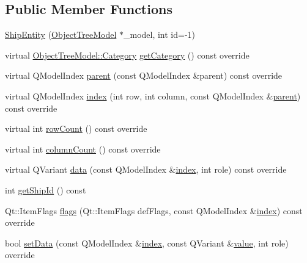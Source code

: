 \subsection*{Public Member Functions}
\begin{DoxyCompactItemize}
\item 
\mbox{\hyperlink{classobjecttree_1_1_ship_entity_afb4b92fd6641d4ee6010d59c5bfec957}{Ship\+Entity}} (\mbox{\hyperlink{class_object_tree_model}{Object\+Tree\+Model}} $\ast$\+\_\+model, int id=-\/1)
\item 
virtual \mbox{\hyperlink{class_object_tree_model_a379e9d6b0d381853785adf62095ba4e3}{Object\+Tree\+Model\+::\+Category}} \mbox{\hyperlink{classobjecttree_1_1_ship_entity_a1d9cd40e6965ab6bf90e4a7953907224}{get\+Category}} () const override
\item 
virtual Q\+Model\+Index \mbox{\hyperlink{classobjecttree_1_1_ship_entity_adafd4b75476c3d15829c75bae3cb2166}{parent}} (const Q\+Model\+Index \&parent) const override
\item 
virtual Q\+Model\+Index \mbox{\hyperlink{classobjecttree_1_1_ship_entity_ad72753eef565dec48ce6a4b8fcd07c4e}{index}} (int row, int column, const Q\+Model\+Index \&\mbox{\hyperlink{classobjecttree_1_1_ship_entity_adafd4b75476c3d15829c75bae3cb2166}{parent}}) const override
\item 
virtual int \mbox{\hyperlink{classobjecttree_1_1_ship_entity_a725ce29cc4d65bdf546d77aef042a046}{row\+Count}} () const override
\item 
virtual int \mbox{\hyperlink{classobjecttree_1_1_ship_entity_a54b5e8e43ee06d70ab23b23c5a648aa8}{column\+Count}} () const override
\item 
virtual Q\+Variant \mbox{\hyperlink{classobjecttree_1_1_ship_entity_ad1fd003ed90d82f0c621292941484e5b}{data}} (const Q\+Model\+Index \&\mbox{\hyperlink{classobjecttree_1_1_ship_entity_ad72753eef565dec48ce6a4b8fcd07c4e}{index}}, int role) const override
\item 
int \mbox{\hyperlink{classobjecttree_1_1_ship_entity_a9493004c5dfe0a9ecd8362e3eefc17e9}{get\+Ship\+Id}} () const
\item 
Qt\+::\+Item\+Flags \mbox{\hyperlink{classobjecttree_1_1_ship_entity_abc1800df4441a71edbb129f2c8326ecb}{flags}} (Qt\+::\+Item\+Flags def\+Flags, const Q\+Model\+Index \&\mbox{\hyperlink{classobjecttree_1_1_ship_entity_ad72753eef565dec48ce6a4b8fcd07c4e}{index}}) const override
\item 
bool \mbox{\hyperlink{classobjecttree_1_1_ship_entity_ae237b6bde73cb4a24e0c17a6a67b58b1}{set\+Data}} (const Q\+Model\+Index \&\mbox{\hyperlink{classobjecttree_1_1_ship_entity_ad72753eef565dec48ce6a4b8fcd07c4e}{index}}, const Q\+Variant \&\mbox{\hyperlink{diffusion_8cpp_a4b41795815d9f3d03abfc739e666d5da}{value}}, int role) override
\end{DoxyCompactItemize}
